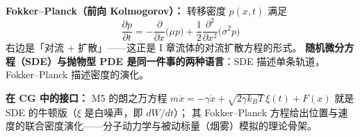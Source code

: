\textbf{Fokker--Planck（前向 Kolmogorov）：} 转移密度 $p(x,t)$ 满足
\[
\frac{\partial p}{\partial t}=-\frac{\partial}{\partial x}\big(\mu p\big)+\frac12\frac{\partial^2}{\partial x^2}\big(\sigma^2p\big)
\]
右边是「对流 $+$ 扩散」——这正是 I 章流体的对流扩散方程的形式。
\textbf{随机微分方程（SDE）与抛物型 PDE 是同一件事的两种语言}：SDE 描述单条轨道，Fokker--Planck 描述密度的演化。

\textbf{在 CG 中的接口：} M5 的朗之万方程 $m\ddot x=-\gamma\dot x+\sqrt{2\gamma k_BT}\,\xi(t)+F(x)$
就是 SDE 的牛顿版（$\xi$ 是白噪声，即 $dW/dt$）；
其 Fokker--Planck 方程给出位置与速度的联合密度演化——分子动力学与被动标量（烟雾）模拟的理论骨架。